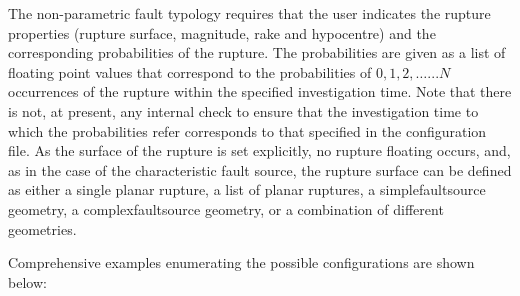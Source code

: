 The non-parametric fault typology requires that the user indicates the rupture properties (rupture surface, magnitude, rake and hypocentre) and the corresponding probabilities of the rupture. The probabilities are given as a list of floating point values that correspond to the probabilities of $0, 1, 2, \ldots ... N$ occurrences of the rupture within the specified investigation time. Note that there is not, at present, any internal check to ensure that the investigation time to which the probabilities refer corresponds to that specified in the configuration file. As the surface of the rupture is set explicitly, no rupture floating occurs, and, as in the case of the characteristic fault source, the rupture surface can be defined as either a single planar rupture, a list of planar ruptures, a \gls{simplefaultsource} geometry, a \gls{complexfaultsource} geometry, or a combination of different geometries.

Comprehensive examples enumerating the possible configurations are shown below:

\inputminted[firstline=1,firstnumber=1,fontsize=\footnotesize,frame=single,linenos,bgcolor=lightgray]{xml}{oqum/hazard/verbatim/input_nonparametric_planar.xml}
\inputminted[firstline=1,firstnumber=1,fontsize=\footnotesize,frame=single,linenos,bgcolor=lightgray]{xml}{oqum/hazard/verbatim/input_nonparametric_simple.xml}
\inputminted[firstline=1,firstnumber=1,fontsize=\footnotesize,frame=single,linenos,bgcolor=lightgray]{xml}{oqum/hazard/verbatim/input_nonparametric_complex.xml}

%

